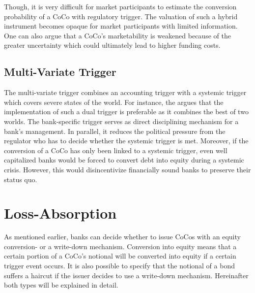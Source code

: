 Though, it is very difficult for market participants to estimate the conversion probability of a CoCo with regulatory trigger. The valuation of such a hybrid instrument becomes opaque for market participants with limited information. \citep{alvemar2012modelling} One can also argue that a CoCo's marketability is weakened because of the greater uncertainty which could ultimately lead to higher funding costs. \citep{de2014handbook} 

\subsection{Multi-Variate Trigger} \label{multivariatetrigger}

The multi-variate trigger combines an accounting trigger with a systemic trigger which covers severe states of the world. For instance, the \citet{squam2009expedited} argues that the implementation of such a dual trigger is preferable as it combines the best of two worlds. The bank-specific trigger serves as direct disciplining mechanism for a bank's management. In parallel, it reduces the political pressure from the regulator who has to decide whether the systemic trigger is met. Moreover, if the conversion of a CoCo has only been linked to a systemic trigger, even well capitalized banks would be forced to convert debt into equity during a systemic crisis. However, this would disincentivize financially sound banks to preserve their status quo. \\


\section{Loss-Absorption} \label{lossabsorption}

As mentioned earlier, banks can decide whether to issue CoCos with an equity conversion- or a write-down mechanism. Conversion into equity means that a certain portion of a CoCo's notional will be converted into equity if a certain trigger event occurs. It is also possible to specify that the notional of a bond suffers a haircut if the issuer decides to use a write-down mechanism. Hereinafter both types will be explained in detail.

